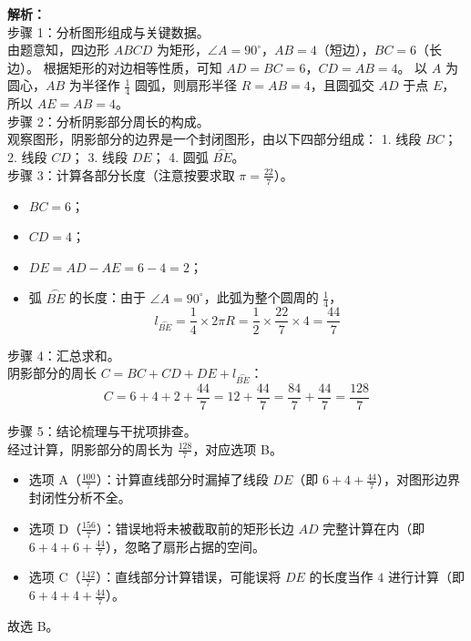 \documentclass[12pt,a4paper]{exam-zh}
\providecommand{\wideparen}[1]{\overset{\frown}{#1}}
\begin{document}
\begin{solution}
    \textbf{解析：} \\
    步骤 1：分析图形组成与关键数据。 \\
    由题意知，四边形 $ABCD$ 为矩形，$\angle A = 90^\circ$，$AB=4$（短边），$BC=6$（长边）。
    根据矩形的对边相等性质，可知 $AD = BC = 6$，$CD = AB = 4$。
    以 $A$ 为圆心，$AB$ 为半径作 $\frac{1}{4}$ 圆弧，则扇形半径 $R = AB = 4$，且圆弧交 $AD$ 于点 $E$，所以 $AE = AB = 4$。 \\
    
    步骤 2：分析阴影部分周长的构成。 \\
    观察图形，阴影部分的边界是一个封闭图形，由以下四部分组成：
    1. 线段 $BC$；
    2. 线段 $CD$；
    3. 线段 $DE$；
    4. 圆弧 $\wideparen{BE}$。 \\
    
    步骤 3：计算各部分长度（注意按要求取 $\displaystyle \pi = \frac{22}{7}$）。 \\
    \begin{itemize}
        \item $BC = 6$；
        \item $CD = 4$；
        \item $DE = AD - AE = 6 - 4 = 2$；
        \item 弧 $\wideparen{BE}$ 的长度：由于 $\angle A = 90^\circ$，此弧为整个圆周的 $\frac{1}{4}$，
        \[ \displaystyle l_{\wideparen{BE}} = \frac{1}{4} \times 2 \pi R = \frac{1}{2} \times \frac{22}{7} \times 4 = \frac{44}{7} \]
    \end{itemize}
    
    步骤 4：汇总求和。 \\
    阴影部分的周长 $C = BC + CD + DE + l_{\wideparen{BE}}$：
    \[ \displaystyle C = 6 + 4 + 2 + \frac{44}{7} = 12 + \frac{44}{7} = \frac{84}{7} + \frac{44}{7} = \frac{128}{7} \]
    
    步骤 5：结论梳理与干扰项排查。 \\
    经过计算，阴影部分的周长为 $\displaystyle \frac{128}{7}$，对应选项 B。
    \begin{itemize}
        \item 选项 A（$\displaystyle \frac{100}{7}$）：计算直线部分时漏掉了线段 $DE$（即 $6+4+\frac{44}{7}$），对图形边界封闭性分析不全。
        \item 选项 D（$\displaystyle \frac{156}{7}$）：错误地将未被截取前的矩形长边 $AD$ 完整计算在内（即 $6+4+6+\frac{44}{7}$），忽略了扇形占据的空间。
        \item 选项 C（$\displaystyle \frac{142}{7}$）：直线部分计算错误，可能误将 $DE$ 的长度当作 $4$ 进行计算（即 $6+4+4+\frac{44}{7}$）。
    \end{itemize}
    
    故选 B。
\end{solution}
\end{document}
